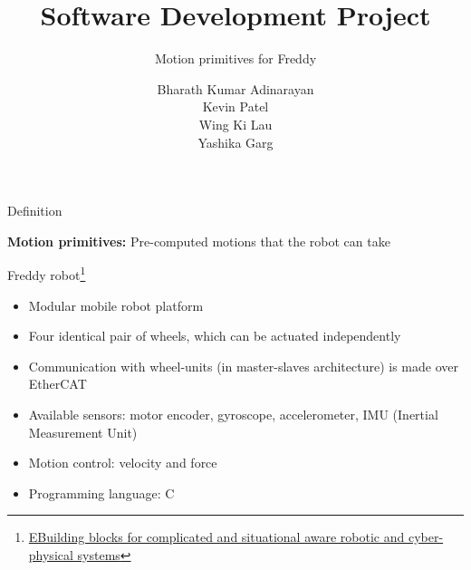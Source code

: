 \documentclass{beamer}
\author[]{Bharath Kumar Adinarayan\\ Kevin Patel\\  Wing Ki Lau \\  Yashika Garg}
\title{Software Development Project}
\subtitle{Motion primitives for Freddy}
\institute[HBRS]{Hochschule Bonn-Rhein-Sieg}
\date{}
\begin{document}
{
\begin{frame}
\titlepage
\end{frame}
}

\begin{frame}{Definition}
\begin{tcolorbox}[colback=blue!5!white,colframe=blue!75!black]
\textbf {Motion primitives:} 
Pre-computed motions that the robot can take
\end{tcolorbox}
\end{frame}


\begin{frame}{Freddy robot}\footnote{\href{https://robmosys.pages.gitlab.kuleuven.be/composable-and-explainable-systems-of-systems.pdf}{EBuilding blocks for complicated and situational aware robotic and cyber-physical systems}}


\begin{itemize}
    \item Modular mobile robot platform
    \item Four identical pair of wheels, which can be actuated independently  
    \item Communication with wheel-units (in master-slaves architecture) is made over EtherCAT
    \item Available sensors: motor encoder, gyroscope, accelerometer, IMU (Inertial Measurement Unit)
    \item Motion control: velocity and force 
    \item Programming language: C
\end{itemize}

\end{frame}
\end{document}
